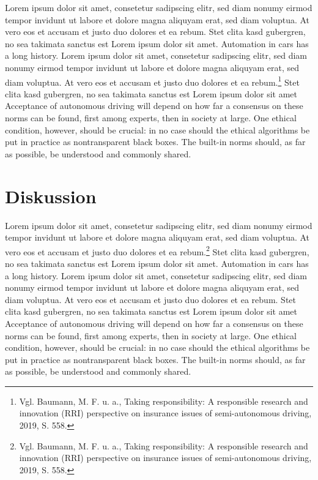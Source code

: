 Lorem ipsum dolor sit amet, consetetur sadipscing elitr, sed diam nonumy eirmod tempor invidunt ut labore et dolore magna aliquyam erat, sed diam voluptua. 
At vero eos et accusam et justo duo dolores et ea rebum. 
Stet clita kasd gubergren, no sea takimata sanctus est Lorem ipsum dolor sit amet. 
Automation in cars has a long history.  Lorem ipsum dolor sit amet, consetetur sadipscing elitr, sed diam nonumy eirmod tempor invidunt ut labore et dolore magna aliquyam erat, sed diam voluptua. 
At vero eos et accusam et justo duo dolores et ea rebum.\footnote{Vgl. Baumann, M. F. u. a., Taking responsibility: A responsible research and innovation (RRI) perspective on insurance issues of semi-autonomous driving, 2019, S. 558.} 
Stet clita kasd gubergren, no sea takimata sanctus est Lorem ipsum dolor sit amet Acceptance of autonomous driving will depend on how far a consensus on these norms can be found, first among experts, then in society at large. 
One ethical condition, however, should be crucial: in no case should the ethical algorithms be put in practice as nontransparent black boxes. 
The built-in norms should, as far as possible, be understood and commonly shared.
	      	      	      	      	      
\section{Diskussion}
	      	      	      	      	      
Lorem ipsum dolor sit amet, consetetur sadipscing elitr, sed diam nonumy eirmod tempor invidunt ut labore et dolore magna aliquyam erat, sed diam voluptua. 
At vero eos et accusam et justo duo dolores et ea rebum.\footnote{Vgl. Baumann, M. F. u. a., Taking responsibility: A responsible research and innovation (RRI) perspective on insurance issues of semi-autonomous driving, 2019, S. 558.} 
Stet clita kasd gubergren, no sea takimata sanctus est Lorem ipsum dolor sit amet. 
Automation in cars has a long history.  Lorem ipsum dolor sit amet, consetetur sadipscing elitr, sed diam nonumy eirmod tempor invidunt ut labore et dolore magna aliquyam erat, sed diam voluptua. 
At vero eos et accusam et justo duo dolores et ea rebum. 
Stet clita kasd gubergren, no sea takimata sanctus est Lorem ipsum dolor sit amet Acceptance of autonomous driving will depend on how far a consensus on these norms can be found, first among experts, then in society at large. 
One ethical condition, however, should be crucial: in no case should the ethical algorithms be put in practice as nontransparent black boxes. 
The built-in norms should, as far as possible, be understood and commonly shared.
	      	      	      	      	      
